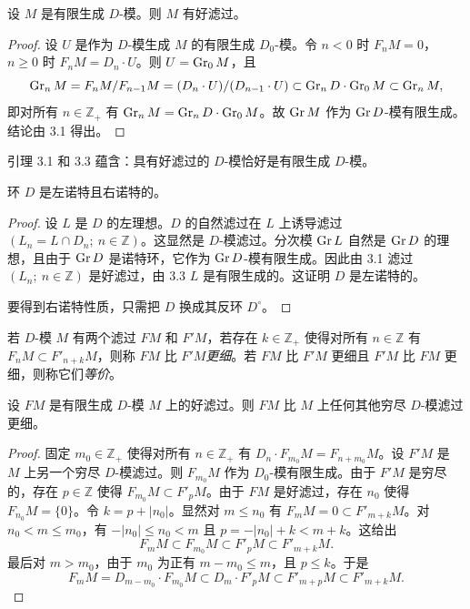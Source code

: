 \begin{lemma}
设 $M$ 是有限生成 $D$-模。则 $M$ 有好滤过。
\end{lemma}

\begin{proof}
设 $U$ 是作为 $D$-模生成 $M$ 的有限生成 $D_0$-模。令 $n<0$ 时 $F_n M=0$，$n\ge 0$ 时 $F_n M=D_n\cdot U$。则 $U=\operatorname{Gr}_0 M$，且
$$\operatorname{Gr}_n M=F_n M/F_{n-1}M=(D_n\cdot U)/(D_{n-1}\cdot U)\subset\operatorname{Gr}_n D\cdot\operatorname{Gr}_0 M\subset\operatorname{Gr}_n M,$$
即对所有 $n\in\mathbb{Z}_+$ 有 $\operatorname{Gr}_n M=\operatorname{Gr}_n D\cdot\operatorname{Gr}_0 M$。故 $\operatorname{Gr} M$ 作为 $\operatorname{Gr} D$-模有限生成。结论由 3.1 得出。
\end{proof}

引理 3.1 和 3.3 蕴含：具有好滤过的 $D$-模恰好是有限生成 $D$-模。

\begin{proposition}
环 $D$ 是左诺特且右诺特的。
\end{proposition}

\begin{proof}
设 $L$ 是 $D$ 的左理想。$D$ 的自然滤过在 $L$ 上诱导滤过 $(L_n=L\cap D_n;\ n\in\mathbb{Z})$。这显然是 $D$-模滤过。分次模 $\operatorname{Gr} L$ 自然是 $\operatorname{Gr} D$ 的理想，且由于 $\operatorname{Gr} D$ 是诺特环，它作为 $\operatorname{Gr} D$-模有限生成。因此由 3.1 滤过 $(L_n;\ n\in\mathbb{Z})$ 是好滤过，由 3.3 $L$ 是有限生成的。这证明 $D$ 是左诺特的。

要得到右诺特性质，只需把 $D$ 换成其反环 $D^\circ$。
\end{proof}

若 $D$-模 $M$ 有两个滤过 $F M$ 和 $F'M$，若存在 $k\in\mathbb{Z}_+$ 使得对所有 $n\in\mathbb{Z}$ 有 $F_n M\subset F'_{n+k}M$，则称 $F M$ 比 $F'M$\emph{更细}。若 $F M$ 比 $F'M$ 更细且 $F'M$ 比 $F M$ 更细，则称它们\emph{等价}。

\begin{lemma}
设 $F M$ 是有限生成 $D$-模 $M$ 上的好滤过。则 $F M$ 比 $M$ 上任何其他穷尽 $D$-模滤过更细。
\end{lemma}

\begin{proof}
固定 $m_0\in\mathbb{Z}_+$ 使得对所有 $n\in\mathbb{Z}_+$ 有 $D_n\cdot F_{m_0}M=F_{n+m_0}M$。设 $F'M$ 是 $M$ 上另一个穷尽 $D$-模滤过。则 $F_{m_0}M$ 作为 $D_0$-模有限生成。由于 $F'M$ 是穷尽的，存在 $p\in\mathbb{Z}$ 使得 $F_{m_0}M\subset F'_p M$。由于 $F M$ 是好滤过，存在 $n_0$ 使得 $F_{n_0}M=\{0\}$。令 $k=p+|n_0|$。显然对 $m\le n_0$ 有 $F_m M=0\subset F'_{m+k}M$。对 $n_0<m\le m_0$，有 $-|n_0|\le n_0<m$ 且 $p=-|n_0|+k<m+k$。这给出
$$F_m M\subset F_{m_0}M\subset F'_p M\subset F'_{m+k}M.$$
最后对 $m>m_0$，由于 $m_0$ 为正有 $m-m_0\le m$，且 $p\le k$。于是
$$F_m M=D_{m-m_0}\cdot F_{m_0}M\subset D_m\cdot F'_p M\subset F'_{m+p}M\subset F'_{m+k}M.$$
\end{proof}

